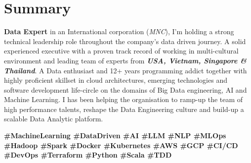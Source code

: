 \section{Summary}
  \textbf{Data Expert} in an International corporation (\emph{MNC}), I’m holding a strong technical leadership role throughout the company’s data driven journey. A solid experienced executive with a proven track record of working in multi-cultural environment and leading team of experts from \textbf{\emph{USA, Vietnam, Singapore \& Thailand}}. A Data enthusiast and 12+ years programming addict together with highly proficient skillset in cloud architectures, emerging technologies and software development life-circle on the domains of Big Data engineering, AI and Machine Learning. I has been helping the organisation to ramp-up the team of high performance talents, reshape the Data Engineering culture and build-up a scalable Data Analytic platform.
  
  \textbf{\scriptsize{
    \#MachineLearning
    \#DataDriven
    \#AI
    \#LLM
    \#NLP
    \#MLOps
    \#Hadoop
    \#Spark                                                                                                                                                                                                                                                      
    \#Docker
    \#Kubernetes
    \#AWS
    \#GCP
    \#CI/CD
    \#DevOps
    \#Terraform
    \#Python
    \#Scala
    \#TDD
  }}
